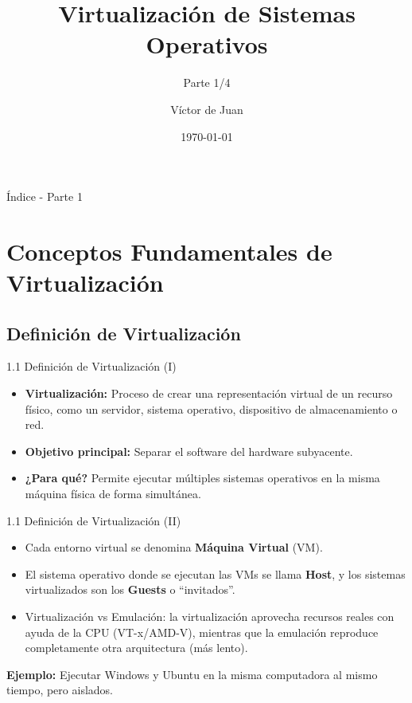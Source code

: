 \documentclass{beamer}
\title{Virtualización de Sistemas Operativos}
\subtitle{Parte 1/4}
\author{Víctor de Juan}
\date{\today}
\begin{document}
\begin{frame}
	\titlepage
\end{frame}

\begin{frame}{Índice - Parte 1}
	\tableofcontents[hideallsubsections]
\end{frame}

\section{Conceptos Fundamentales de Virtualización}

\subsection{Definición de Virtualización}
\begin{frame}{1.1 Definición de Virtualización (I)}
	\begin{itemize}
		\item \textbf{Virtualización:} Proceso de crear una representación virtual de un recurso físico, como un servidor, sistema operativo, dispositivo de almacenamiento o red.
		\item \textbf{Objetivo principal:} Separar el software del hardware subyacente.
		\item \textbf{¿Para qué?} Permite ejecutar múltiples sistemas operativos en la misma máquina física de forma simultánea.
	\end{itemize}
\end{frame}

\begin{frame}{1.1 Definición de Virtualización (II)}
	\begin{itemize}
		\item Cada entorno virtual se denomina \textbf{Máquina Virtual} (VM).  
		\item El sistema operativo donde se ejecutan las VMs se llama \textbf{Host}, y los sistemas virtualizados son los \textbf{Guests} o “invitados”.
		\item Virtualización vs Emulación: la virtualización aprovecha recursos reales con ayuda de la CPU (VT-x/AMD-V), mientras que la emulación reproduce completamente otra arquitectura (más lento).
	\end{itemize}
	\vspace{0.3cm}
	\textbf{Ejemplo:} Ejecutar Windows y Ubuntu en la misma computadora al mismo tiempo, pero aislados.
\end{frame}
\end{document}
